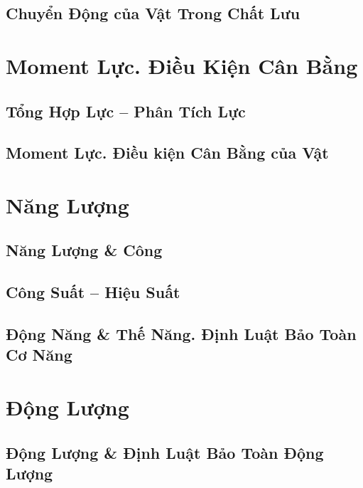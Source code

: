 \documentclass[oneside]{book}
\numberwithin{equation}{section}
\begin{document}
\section{Chuyển Động của Vật Trong Chất Lưu}


\chapter{Moment Lực. Điều Kiện Cân Bằng}

\section{Tổng Hợp Lực -- Phân Tích Lực}

\section{Moment Lực. Điều kiện Cân Bằng của Vật}


\chapter{Năng Lượng}

\section{Năng Lượng \& Công}

\section{Công Suất -- Hiệu Suất}

\section{Động Năng \& Thế Năng. Định Luật Bảo Toàn Cơ Năng}


\chapter{Động Lượng}

\section{Động Lượng \& Định Luật Bảo Toàn Động Lượng}
\end{document}
